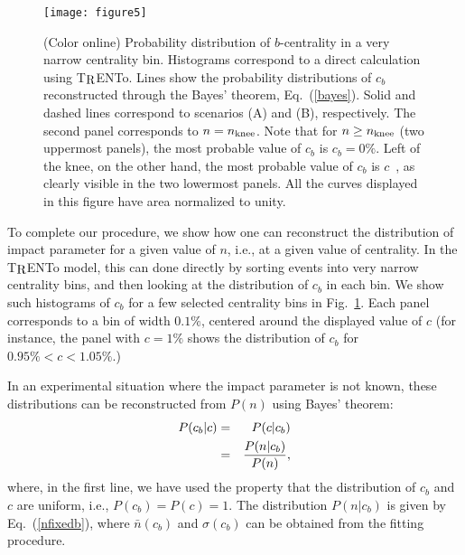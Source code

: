 \documentclass[aps,prc,twocolumn,superscriptaddress,showpacs,floatfix,nofootinbib]{revtex4-1}
\newcommand{\trento}{T$\mathrel{\protect\raisebox{-2.1pt}{R}}$ENTo}
\begin{document}
\begin{figure}[t!]
\begin{center}
\texttt{[image: figure5]}
\end{center}
\caption{(Color online)
Probability distribution of $b$-centrality in a very narrow centrality bin. Histograms correspond to a direct calculation using \trento{}.  Lines show the probability distributions of $c_b$ reconstructed through the Bayes' theorem, Eq.~(\ref{bayes}). Solid and dashed lines correspond to scenarios (A) and (B), respectively.  The second panel corresponds to $n= n_{\rm knee}$. Note that for $n \ge n_{\rm knee}$ (two uppermost panels), the most probable value of $c_b$ is $c_b=0\%$. Left of the knee, on the other hand, the most probable value of $c_b$ is $c$~\cite{Broniowski:2001ei}, as clearly visible in the two lowermost panels. All the curves displayed in this figure have area normalized to unity.
}
\label{fig:cbdist}
\end{figure} 
To complete our procedure, we show how one can reconstruct the distribution of impact parameter  for a given value of $n$, i.e., at a given value of centrality.
In the {\trento} model, this can done directly by sorting events into very narrow centrality bins, and then looking at the distribution of $c_b$ in each bin.
We show such histograms of $c_b$ for a few selected centrality bins in Fig.~\ref{fig:cbdist}.
Each panel corresponds to a bin of width $0.1\%$, centered around the displayed value of $c$ (for instance, the panel with $c=1\%$ shows the distribution of $c_b$ for $0.95\% < c < 1.05\%$.)

In an experimental situation where the impact parameter is not known, these distributions can be reconstructed from $P(n)$ using Bayes' theorem: 
\begin{eqnarray}
\label{bayes}
P(c_b|c)&=&P(c|c_b)\cr
&=&\frac{P(n|c_b)}{P(n)}, 
\end{eqnarray}
where, in the first line, we have used the property that the distribution of $c_b$ and $c$ are uniform, i.e., $P(c_b)=P(c)=1$. 
The distribution $P(n|c_b)$ is given by Eq.~(\ref{nfixedb}), where $\bar n(c_b)$ and $\sigma(c_b)$ can be obtained from the fitting procedure. 
\end{document}
